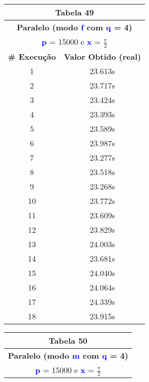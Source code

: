 \documentclass[11pt]{article}
\begin{document}
\begin{table}[!h]
	\begin{center}
		\begin{minipage}{0.48\textwidth}
			\begin{tabular}{| c | c |}
			\hline
			\multicolumn{2}{|c|}{\textbf{Tabela 49}} \\ \hline
			\multicolumn{2}{|c|}{\textbf{Paralelo (modo \textbf{\textcolor{blue}{f}} com \textbf{\textcolor{blue}{q}} = 4)}} \\
			\multicolumn{2}{|c|}{\textbf{\textcolor{blue}{p}} = 15000 e \textbf{\textcolor{blue}{x}} = $\frac{\pi}{2}$} \\ [0.2ex]
			\hline
				\textbf{\# Execução} &  \textbf{Valor Obtido (real)} \\ \hline
				1 & 23.613s \\ \hline
				2 & 23.717s \\ \hline
				3 & 23.424s \\ \hline
				4 & 23.393s \\ \hline
				5 & 23.589s \\ \hline
				6 & 23.987s \\ \hline
				7 & 23.277s \\ \hline
				8 & 23.518s \\ \hline
				9 & 23.268s \\ \hline
				10 & 23.772s \\ \hline
				11 & 23.609s \\ \hline
				12 & 23.829s \\ \hline
				13 & 24.003s \\ \hline
				14 & 23.681s \\ \hline
				15 & 24.040s \\ \hline
				16 & 24.064s \\ \hline
				17 & 24.339s \\ \hline
				18 & 23.915s \\ \hline
			\end{tabular}
		\end{minipage}
		\begin{minipage}{0.48\textwidth}
			\begin{tabular}{| c | c |}
			\hline
			\multicolumn{2}{|c|}{\textbf{Tabela 50}} \\ \hline
			\multicolumn{2}{|c|}{\textbf{Paralelo (modo \textbf{\textcolor{blue}{m}} com \textbf{\textcolor{blue}{q}} = 4)}} \\
			\multicolumn{2}{|c|}{\textbf{\textcolor{blue}{p}} = 15000 e \textbf{\textcolor{blue}{x}} = $\frac{\pi}{2}$} \\ [0.2ex]

\end{tabular}
\end{minipage}
\end{center}
\end{table}
\end{document}
